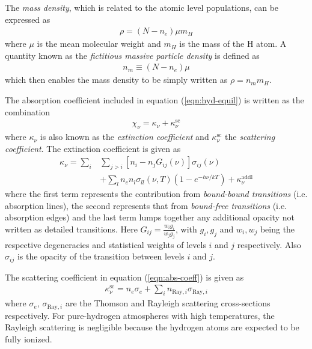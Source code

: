 				The \textit{mass density}, which is related to the atomic level populations, can be expressed as
				\begin{align}
					\rho=(N-n_e)\mu m_H \label{eqn:mass-dens}
				\end{align}
				where $\mu$ is the mean molecular weight and $m_H$ is the mass of the H atom. A quantity known as the \textit{fictitious massive particle density} is defined as
				\begin{align}
					n_m\equiv(N-n_e)\mu \label{eqn:fict-mass-dens}
				\end{align}
				which then enables the mass density to be simply written as $\rho=n_m m_H$.
				
				The absorption coefficient included in equation (\ref{eqn:hyd-equil}) is written as the combination
				\begin{align}
					\chi_\nu=\kappa_\nu+\kappa_\nu^\text{sc} \label{eqn:abs-coeff}
				\end{align}
				where $\kappa_\nu$ is also known as the \textit{extinction coefficient} and $\kappa_\nu^\text{sc}$ the \textit{scattering coefficient}. The extinction coefficient is given as
				\begin{align}
					\kappa_\nu=\sum_{i}&\sum_{j>i}{[n_i-n_jG_{ij}(\nu)]\sigma_{ij}(\nu)} \nonumber\\
									&+\sum_{l}{n_en_l\sigma_{ll}(\nu,T)\left( 1-e^{-h\nu/kT} \right)}+\kappa_\nu^\text{addl} \label{eqn:ext-abs-coeff}
				\end{align}
				where the first term represents the contribution from \textit{bound-bound transitions} (i.e. absorption lines), the second represents that from \textit{bound-free transitions} (i.e. absorption edges) and the last term lumps together any additional opacity not written as detailed transitions. Here $G_{ij}=\frac{w_ig_i}{w_jg_j}$, with $g_i,g_j$ and $w_i,w_j$ being the respective degeneracies and statistical weights of levels $i$ and $j$ respectively. Also $\sigma_{ij}$ is the opacity of the transition between levels $i$ and $j$.
				
				The scattering coefficient in equation (\ref{eqn:abs-coeff}) is given as
				\begin{align}
					\kappa_\nu^\text{sc}=n_e\sigma_e + \sum_i{n_{\text{Ray},i}\sigma_{\text{Ray},i}} \label{eqn:sca-abs-coeff}
				\end{align}
				where $\sigma_e$, $\sigma_{\text{Ray},i}$ are the Thomson and Rayleigh scattering cross-sections respectively. For pure-hydrogen atmospheres with high temperatures, the Rayleigh scattering is negligible because the hydrogen atoms are expected to be fully ionized.
				
